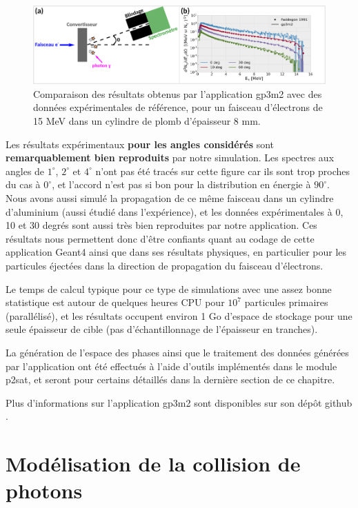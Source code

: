\begin{refsection}
\begin{figure}[hbtp]
	\centering
	\includegraphics[width=\linewidth]{4-simulation/gp3m2_validation.png}
	\caption{Comparaison des résultats obtenus par l'application gp3m2 avec des données expérimentales de référence, pour un faisceau d'électrons de 15 MeV dans un cylindre de plomb d'épaisseur 8 mm.}
	\label{fig:4-MC_validation_gp3m2}
\end{figure}

Les résultats expérimentaux \textbf{pour les angles considérés} sont \textbf{remarquablement bien reproduits} par notre simulation. Les spectres aux angles de $1^\circ$, $2^\circ$ et $4^\circ$ n'ont pas été tracés sur cette figure car ils sont trop proches du cas à $0^\circ$, et l'accord n'est pas si bon pour la distribution en énergie à $90^\circ$. Nous avons aussi simulé la propagation de ce même faisceau dans un cylindre d'aluminium (aussi étudié dans l'expérience), et les données expérimentales à 0, 10 et 30 degrés sont aussi très bien reproduites par notre application. Ces résultats nous permettent donc d'être confiants quant au codage de cette application Geant4 ainsi que dans ses résultats physiques, en particulier pour les particules éjectées dans la direction de propagation du faisceau d'électrons.

Le temps de calcul typique pour ce type de simulations avec une assez bonne statistique est autour de quelques heures CPU pour $10^7$ particules primaires (parallélisé), et les résultats occupent environ 1 Go d'espace de stockage pour une seule épaisseur de cible (pas d’échantillonnage de l'épaisseur en tranches).


La génération de l'espace des phases ainsi que le traitement des données générées par l'application ont été effectués à l'aide d'outils implémentés dans le module p2sat, et seront pour certains détaillés dans la dernière section de ce chapitre.

Plus d'informations sur l'application gp3m2 sont disponibles sur son dépôt github \parencite{gp3m2}.

\section{Modélisation de la collision de photons}


\end{refsection}
